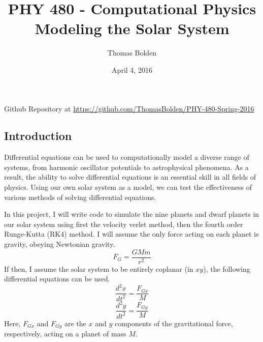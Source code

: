\documentclass[11pt]{article}
\title{PHY 480 - Computational Physics \\ Modeling the Solar System}
\author{Thomas Bolden}
\date{April 4, 2016}
\begin{document}
\maketitle

\thispagestyle{empty}

\centerline{Github Repository at \href{https://github.com/ThomasBolden/PHY-480-Spring-2016}{https://github.com/ThomasBolden/PHY-480-Spring-2016}}

\begin{abstract}

    \lipsum[1-1]

\end{abstract}

\vfill

\tableofcontents

\vspace{3cm}

\pagebreak

\subsection{Introduction}

    Differential equations can be used to computationally model a 
    diverse range of systems, from harmonic oscillator potentials to 
    astrophysical phenomena. As a result, the ability to solve 
    differential equations is an essential skill in all fields of 
    physics. Using our own solar system as a model, we can test the 
    effectiveness of various methods of solving differential equations.

    In this project, I will write code to simulate the nine planets and 
    dwarf planets in our solar system using first the velocity verlet 
    method, then the fourth order Runge-Kutta (RK4) method. I will 
    assume the only force acting on each planet is gravity, obeying Newtonian gravity.
    \begin{equation} F_G = \dfrac{GMm}{r^2} \end{equation}
    If then, I assume the solar system to be entirely coplanar (in $xy$), the following differential equations can be used.
    \begin{equation} \dfrac{d^2x}{dt^2} = \dfrac{F_{Gx}}{M} \end{equation}
    \begin{equation} \dfrac{d^2y}{dt^2} = \dfrac{F_{Gy}}{M} \end{equation}
    Here, $F_{Gx}$ and $F_{Gy}$ are the $x$ and $y$ components of the gravitational force, respectively, acting on a planet of mass $M$.
\end{document}
